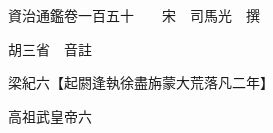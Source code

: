 










 


 
 


 

  
  
  
  
  





  
  
  
  
  
 
  

  

  
  
  



  

 
 

  
   




  

  
  


  　　資治通鑑卷一百五十　　宋　司馬光　撰

　　胡三省　音註

　　梁紀六【起閼逢執徐盡旃蒙大荒落凡二年】

　　高祖武皇帝六

